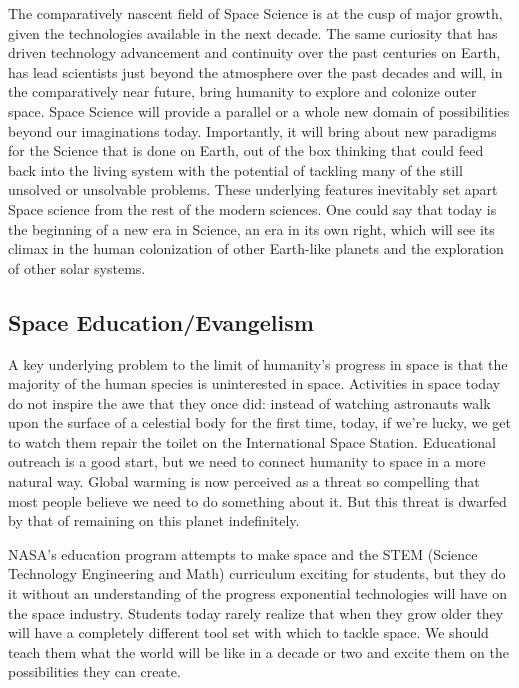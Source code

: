 \documentclass[letter,11pt]{article}
\begin{document}
The comparatively nascent field of Space Science is at the cusp of major
growth, given the technologies available in the next decade. The same curiosity
that has driven technology advancement and continuity over the past centuries
on Earth, has lead scientists just beyond the atmosphere over the past decades
and will, in the comparatively near future, bring humanity to explore and
colonize outer space. Space Science will provide a parallel or a whole new
domain of possibilities beyond our imaginations today. Importantly, it will
bring about new paradigms for the Science that is done on Earth, out of the box
thinking that could feed back into the living system with the potential of
tackling many of the still unsolved or unsolvable problems. These underlying
features inevitably set apart Space science from the rest of the modern
sciences. One could say that today is the beginning of a new era in Science, an
era in its own right, which will see its climax in the human colonization of
other Earth-like planets and the exploration of other solar systems. 

\subsection{Space Education/Evangelism}
\label{ps-space-evangelism}

A key underlying problem to the limit  of humanity's progress in space is that the majority of the human  species is uninterested in space. Activities in space today do not  inspire the awe that they once did: instead of watching astronauts walk  upon the surface of a celestial body for the first time, today, if we're  lucky, we get to watch them repair the toilet on the International  Space Station. Educational outreach is a good start, but we need to  connect humanity to space in a more natural way. Global warming is now  perceived as a threat so compelling that most people believe we need to  do something about it. But this threat is dwarfed by that of remaining  on this planet indefinitely.

NASA's  education program attempts to make space and the STEM (Science  Technology Engineering and Math) curriculum exciting for students, but  they do it without an understanding of the progress exponential  technologies will have on the space industry. Students today rarely  realize that when they grow older they will have a completely different  tool set with which to tackle space. We should teach them what the world  will be like in a decade or two and excite them on the possibilities  they can create.
\end{document}
